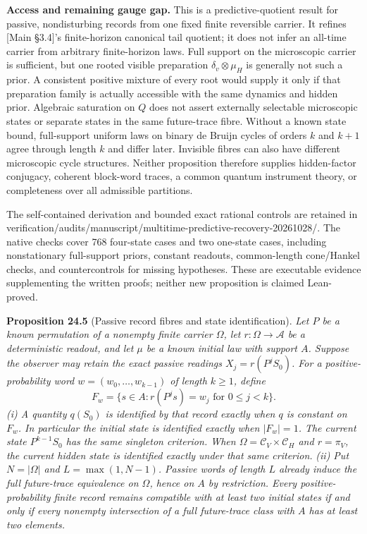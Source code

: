 \documentclass[
]{article}
\begin{document}
\textbf{Access and remaining gauge gap.} This is a predictive-quotient
result for passive, nondisturbing records from one fixed finite
reversible carrier. It refines {[}Main §3.4{]}'s finite-horizon
canonical tail quotient; it does not infer an all-time carrier from
arbitrary finite-horizon laws. Full support on the microscopic carrier
is sufficient, but one rooted visible preparation
\(\delta_v\otimes\mu_H\) is generally not such a prior. A consistent
positive mixture of every root would supply it only if that preparation
family is actually accessible with the same dynamics and hidden prior.
Algebraic saturation on \(Q\) does not assert externally selectable
microscopic states or separate states in the same future-trace fibre.
Without a known state bound, full-support uniform laws on binary de
Bruijn cycles of orders \(k\) and \(k+1\) agree through length \(k\) and
differ later. Invisible fibres can also have different microscopic cycle
structures. Neither proposition therefore supplies hidden-factor
conjugacy, coherent block-word traces, a common quantum instrument
theory, or completeness over all admissible partitions.

The self-contained derivation and bounded exact rational controls are
retained in
verification/audits/manuscript/multitime-predictive-recovery-20261028/.
The native checks cover 768 four-state cases and two one-state cases,
including nonstationary full-support priors, constant readouts,
common-length cone/Hankel checks, and countercontrols for missing
hypotheses. These are executable evidence supplementing the written
proofs; neither new proposition is claimed Lean-proved.

\textbf{Proposition 24.5} (Passive record fibres and state
identification). \emph{Let \(P\) be a known permutation of a nonempty
finite carrier \(\Omega\), let \(r:\Omega\to\mathcal A\) be a
deterministic readout, and let \(\mu\) be a known initial law with
support \(A\). Suppose the observer may retain the exact passive
readings \(X_j=r(P^jS_0)\). For a positive-probability word
\(w=(w_0,\ldots,w_{k-1})\) of length \(k\ge1\), define}
\[F_w=\{s\in A:r(P^js)=w_j\text{ for }0\le j<k\}.\] \emph{(i) A quantity
\(q(S_0)\) is identified by that record exactly when \(q\) is constant
on \(F_w\). In particular the initial state is identified exactly when
\(|F_w|=1\). The current state \(P^{k-1}S_0\) has the same singleton
criterion. When \(\Omega=\mathcal C_V\times\mathcal C_H\) and
\(r=\pi_V\), the current hidden state is identified exactly under that
same criterion.} \emph{(ii) Put \(N=|\Omega|\) and \(L=\max(1,N-1)\).
Passive words of length \(L\) already induce the full future-trace
equivalence on \(\Omega\), hence on \(A\) by restriction. Every
positive-probability finite record remains compatible with at least two
initial states if and only if every nonempty intersection of a full
future-trace class with \(A\) has at least two elements.}
\end{document}
